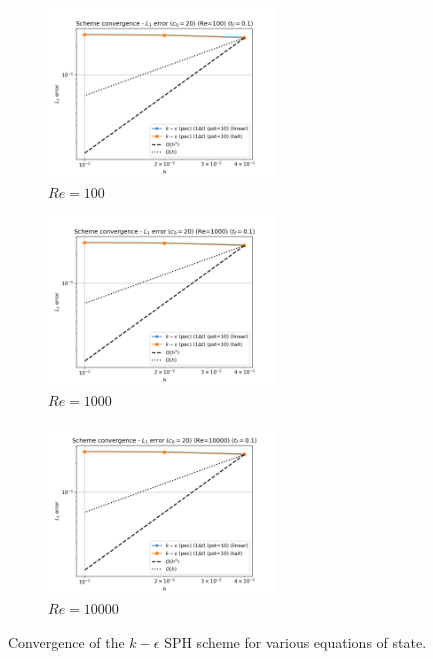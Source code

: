 \begin{figure}[htbp!]
  \begin{subfigure}{7cm}
    \centering\includegraphics[width=6cm]{Code-Figures/keps/eos/dt_pois_conv_c0_20_re_100.png}
    \caption{$Re = 100$}
  \end{subfigure}
  \begin{subfigure}{7cm}
    \centering\includegraphics[width=6cm]{Code-Figures/keps/eos/dt_pois_conv_c0_20_re_1000.png}
    \caption{$Re = 1000$}
  \end{subfigure}
  \begin{subfigure}{7cm}
    \centering\includegraphics[width=6cm]{Code-Figures/keps/eos/dt_pois_conv_c0_20_re_10000.png}
    \caption{$Re = 10000$}
  \end{subfigure}
  \caption{Convergence of the $k-\epsilon$ SPH scheme for various equations of state.}
  \label{fig:keps-eos}
\end{figure}

